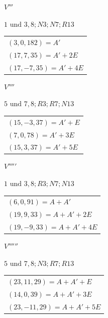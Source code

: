 \begin{center}
\begin{minipage}[t]{0.47\linewidth}\centering
\(V'''\)\par\smallskip
{\small \(1\text{ und }3, 8; N3; N7; R13\)}\par\smallskip
\begin{tabular}{@{}l@{}}
\((3,0,182)=A'\)\\\((17,7,35)=A'+2E\)\\\((17,-7,35)=A'+4E\)
\end{tabular}
\end{minipage}\hfill\begin{minipage}[t]{0.47\linewidth}\centering
\(V''''\)\par\smallskip
{\small \(5\text{ und }7, 8; R3; R7; N13\)}\par\smallskip
\begin{tabular}{@{}l@{}}
\((15,-3,37)=A'+E\)\\\((7,0,78)=A'+3E\)\\\((15,3,37)=A'+5E\)
\end{tabular}
\end{minipage}
\end{center}
\begin{center}
\begin{minipage}[t]{0.47\linewidth}\centering
\(V'''''\)\par\smallskip
{\small \(1\text{ und }3, 8; R3; N7; N13\)}\par\smallskip
\begin{tabular}{@{}l@{}}
\((6,0,91)=A+A'\)\\\((19,9,33)=A+A'+2E\)\\\((19,-9,33)=A+A'+4E\)
\end{tabular}
\end{minipage}\hfill\begin{minipage}[t]{0.47\linewidth}\centering
\(V''''''\)\par\smallskip
{\small \(5\text{ und }7, 8; N3; R7; R13\)}\par\smallskip
\begin{tabular}{@{}l@{}}
\((23,11,29)=A+A'+E\)\\\((14,0,39)=A+A'+3E\)\\\((23,-11,29)=A+A'+5E\)
\end{tabular}
\end{minipage}
\end{center}

